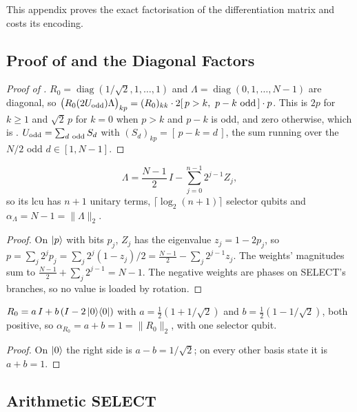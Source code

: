 This appendix proves the exact factorisation of the differentiation matrix and costs its encoding.

\subsection{Proof of \texorpdfstring{}{the factorisation} and the Diagonal Factors}
\label{app:proof-G-factorisation}

\begin{proof}[Proof of ]
$R_0=\operatorname{diag}(1/\sqrt2,1,\dots,1)$ and $\Lambda=\operatorname{diag}(0,1,\dots,N-1)$ are diagonal, so $\bigl(R_0(2\Uodd)\Lambda\bigr)_{kp}=(R_0)_{kk}\cdot2[\,p>k,\ p-k\ \text{odd}\,]\cdot p$. This is $2p$ for $k\ge1$ and $\sqrt2\,p$ for $k=0$ when $p>k$ and $p-k$ is odd, and zero otherwise, which is . $U_{\mathrm{odd}}=\sum_{d\ \text{odd}}S_d$ with $(S_d)_{kp}=[\,p-k=d\,]$, the sum running over the $N/2$ odd $d\in[1,N-1]$.
\end{proof}

\begin{lemma}
\begin{equation}
    \Lambda = \frac{N-1}{2}\,I - \sum_{j=0}^{n-1} 2^{j-1} Z_j ,
    \label{eq:lambda-lcu}
\end{equation}
so its \gls{lcu} has $n+1$ unitary terms, $\lceil\log_2(n+1)\rceil$ selector qubits and $\alpha_\Lambda=N-1=\|\Lambda\|_2$.
\end{lemma}
\begin{proof}
On $\ket{p}$ with bits $p_j$, $Z_j$ has the eigenvalue $z_j=1-2p_j$, so $p=\sum_j2^jp_j=\sum_j2^j(1-z_j)/2=\tfrac{N-1}{2}-\sum_j2^{j-1}z_j$. The weights' magnitudes sum to $\tfrac{N-1}{2}+\sum_j2^{j-1}=N-1$. The negative weights are phases on SELECT's branches, so no value is loaded by rotation.
\end{proof}

\begin{lemma}
$R_0=a\,I+b\,(I-2\ket{0}\!\bra{0})$ with $a=\tfrac12(1+1/\sqrt2)$ and $b=\tfrac12(1-1/\sqrt2)$, both positive, so $\alpha_{R_0}=a+b=1=\|R_0\|_2$, with one selector qubit.
\end{lemma}
\begin{proof}
On $\ket0$ the right side is $a-b=1/\sqrt2$; on every other basis state it is $a+b=1$.
\end{proof}

\subsection{Arithmetic SELECT}
\label{app:uodd-select-detail}

